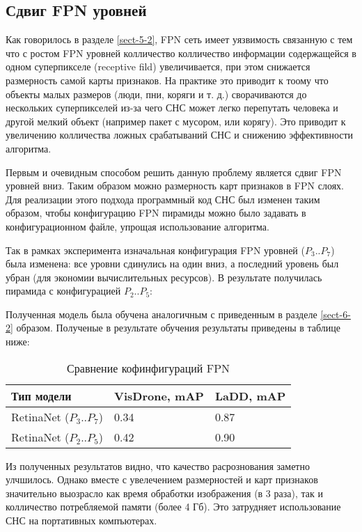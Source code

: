 \subsection{Сдвиг FPN уровней} \label{sect-6-3}

Как говорилось в разделе \ref{sect-5-2}, FPN сеть имеет уязвимость связанную с тем что с ростом FPN уровней колличество колличество информации содержащейся в одном суперпикселе (receptive fild) увеличивается, при этом снижается размерность самой карты признаков. На практике это приводит к тоому что объекты малых размеров (люди, пни, коряги и т. д.) сворачиваются до нескольких суперпикселей из-за чего СНС может легко перепутать человека и другой мелкий объект (например пакет с мусором, или корягу). Это приводит к увеличению колличества ложных срабатываний СНС и снижению эффективности алгоритма.

Первым и очевидным способом решить данную проблему является сдвиг FPN уровней вниз. Таким образом можно размерность карт признаков в FPN слоях. Для реализации этого подхода программный код СНС был изменен таким образом, чтобы конфигурацию FPN пирамиды можно было задавать в конфигурационном файле, упрощая использование алгоритма. 

Так в рамках эксперимента изначальная конфигурация FPN уровней ($P_3..P_7$) была изменена: все уровни сдинулись на один вниз, а последний уровень был убран (для экономии вычислительных ресурсов). В результате получилась пирамида с конфигурацией $P_2..P_5$:


Полученная модель была обучена аналогичным с приведенным в разделе \ref{sect-6-2} образом. Полученые в результате обучения результаты приведены в таблице ниже:

\begin{table}[H]
    \caption{Сравнение кофинфигураций FPN}\label{leaderboard-3}
    \begin{tabular}{|p{5cm}|p{5cm}|p{5cm}|}
        \hline
        {Тип модели} & {VisDrone, mAP} & {LaDD, mAP} \\
        \hline
        RetinaNet ($P_3..P_7$) & 0.34 & 0.87 \\
        \hline
        RetinaNet ($P_2..P_5$) & 0.42 & 0.90 \\
        \hline
    \end{tabular}
\end{table}

Из полученных результатов видно, что качество расрознования заметно улчшилось. Однако вместе с увелечением размерностей и карт признаков значительно выозрасло как время обработки изображения (в 3 раза), так и колличество потребляемой памяти (более 4 Гб). Это затрудняет использование СНС на портативных компъютерах.